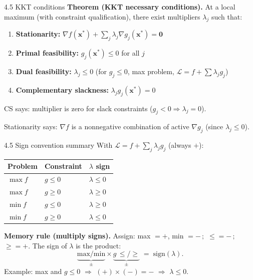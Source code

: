 \documentclass[11pt,aspectratio=169]{beamer}
\begin{document}
\begin{frame}{4.5 KKT conditions}
  \small
  \textbf{Theorem (KKT necessary conditions).} At a local maximum (with constraint qualification), there exist multipliers $\lambda_j$ such that:
  
  \begin{enumerate}
    \item \textbf{Stationarity:} $\nabla f(\mathbf{x}^*) + \sum_j \lambda_j \nabla g_j(\mathbf{x}^*) = \mathbf{0}$
    
    \item \textbf{Primal feasibility:} $g_j(\mathbf{x}^*) \leq 0$ for all $j$
    
    \item \textbf{Dual feasibility:} $\lambda_j \leq 0$ (for $g_j \leq 0$, max problem, $\mathcal{L}=f+\sum\lambda_j g_j$)
    
    \item \textbf{Complementary slackness:} $\lambda_j g_j(\mathbf{x}^*) = 0$
  \end{enumerate}
  
  CS says: multiplier is zero for slack constraints ($g_j < 0 \Rightarrow \lambda_j = 0$).
  
  Stationarity says: $\nabla f$ is a nonnegative combination of active $\nabla g_j$ (since $\lambda_j\leq 0$).
\end{frame}

\begin{frame}{4.5 Sign convention summary}
  \small
  With $\mathcal{L} = f + \sum_j \lambda_j g_j$ (always $+$):
  
  \begin{center}
    \begin{tabular}{@{}lll@{}}
      \toprule
      Problem & Constraint & $\lambda$ sign \\
      \midrule
      $\max f$ & $g \leq 0$ & $\lambda \leq 0$ \\
      $\max f$ & $g \geq 0$ & $\lambda \geq 0$ \\
      $\min f$ & $g \leq 0$ & $\lambda \geq 0$ \\
      $\min f$ & $g \geq 0$ & $\lambda \leq 0$ \\
      \bottomrule
    \end{tabular}
  \end{center}
  
  \textbf{Memory rule (multiply signs).}
  Assign: max $=+$, min $=-\,;$ $\leq=-\,;$ $\geq=+$.
  The sign of $\lambda$ is the product:
  \[
    \underbrace{\mathrm{max}/\!\mathrm{min}}_{\pm}
    \times
    \underbrace{g\,\leq/\!\geq}_{\pm}
    \;=\;
    \mathrm{sign}(\lambda).
  \]
  Example: max and $g\leq 0$ $\Rightarrow$ $(+)\times(-)=-$ $\Rightarrow$ $\lambda\leq 0$.
\end{frame}
\end{document}
